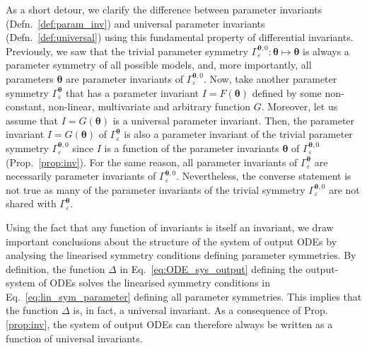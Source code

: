 \documentclass[12pt]{article}
\begin{document}
As a short detour, we clarify the difference between parameter invariants (Defn.~\ref{def:param_inv}) and universal parameter invariants (Defn.~\ref{def:universal}) using this fundamental property of differential invariants. Previously, we saw that the trivial parameter symmetry $\Gamma_{\varepsilon}^{\boldsymbol{\theta},0}:\boldsymbol{\theta}\mapsto\boldsymbol{\theta}$ is always a parameter symmetry of all possible models, and, more importantly, all parameters $\boldsymbol{\theta}$ are parameter invariants of $\Gamma_{\varepsilon}^{\boldsymbol{\theta},0}$. Now, take another parameter symmetry $\Gamma_{\varepsilon}^{\boldsymbol{\theta}}$ that has a parameter invariant $I=F(\boldsymbol{\theta})$ defined by some non-constant, non-linear, multivariate and arbitrary function $G$. Moreover, let us assume that $I=G(\boldsymbol{\theta})$ is a universal parameter invariant. Then, the parameter invariant $I=G(\boldsymbol{\theta})$ of $\Gamma_{\varepsilon}^{\boldsymbol{\theta}}$ is also a parameter invariant of the trivial parameter symmetry $\Gamma_{\varepsilon}^{\boldsymbol{\theta},0}$ since $I$ is a function of the parameter invariants $\boldsymbol{\theta}$ of $\Gamma_{\varepsilon}^{\boldsymbol{\theta},0}$ (Prop.~\ref{prop:inv}). For the same reason, all parameter invariants of $\Gamma_{\varepsilon}^{\boldsymbol{\theta}}$ are necessarily parameter invariants of $\Gamma_{\varepsilon}^{\boldsymbol{\theta},0}$. Nevertheless, the converse statement is not true as many of the parameter invariants of the trivial symmetry $\Gamma_{\varepsilon}^{\boldsymbol{\theta},0}$ are not shared with $\Gamma_{\varepsilon}^{\boldsymbol{\theta}}$. 

Using the fact that any function of invariants is itself an invariant, we draw important conclusions about the structure of the system of output ODEs by analysing the linearised symmetry conditions defining parameter symmetries. By definition, the function $\Delta$ in Eq.~\eqref{eq:ODE_sys_output} defining the output-system of ODEs solves the linearised symmetry conditions in Eq.~\eqref{eq:lin_sym_parameter} defining all parameter symmetries. This implies that the function $\Delta$ is, in fact, a universal invariant. As a consequence of Prop. \ref{prop:inv}, the system of output ODEs can therefore always be written as a function of universal invariants.
\end{document}
